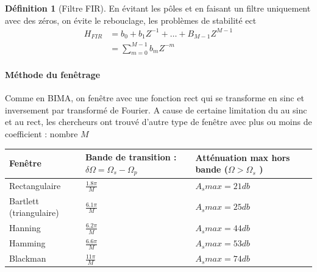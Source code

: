 \documentclass{article}
\theoremstyle{plain}%
\theoremstyle{definition}
\newtheorem{defn}{Définition}[section]
\theoremstyle{remark}
\begin{document}
\begin{defn}[Filtre FIR]
    En évitant les pôles et en faisant un filtre uniquement avec des zéros, on évite le rebouclage, les problèmes de stabilité ect
    \begin{align*}
        H_{FIR} &= b_0 + b_1 Z^{-1} + \dots + B_{M-1}Z^{M-1} \\
                &= \sum_{m=0}^{M-1}b_m Z^{-m}
    \end{align*}
\end{defn}

\paragraph*{Méthode du fenêtrage}
Comme en BIMA, on fenêtre avec une fonction rect qui se transforme en sinc et inversement par transformé de Fourier. A cause de certaine limitation du au sinc et au rect, les chercheurs ont trouvé d'autre type de fenêtre avec plus ou moins de coefficient : nombre $ M $ 

\begin{table}[!ht]
    \centering
    \begin{tabular}{|l|l|l|}
    \hline
        Fenêtre & Bande de transition : $ \delta \Omega = \Omega _s - \Omega _p $   & Atténuation max hors bande ($ \Omega > \Omega _s $ )  \\ \hline
        Rectangulaire & $\frac{1.8 \pi }{M}$ & $ A_s max = 21db $ \\ \hline
        Bartlett (triangulaire) & $\frac{6.1 \pi }{M}$ & $ A_s max = 25db $ \\ \hline
        Hanning & $\frac{6.2\pi }{M}$ & $ A_s max = 44db $ \\ \hline
        Hamming & $\frac{6.6 \pi }{M}$ & $ A_s max = 53db $ \\ \hline
        Blackman & $\frac{11 \pi }{M}$ & $ A_s max = 74db $ \\ \hline
    \end{tabular}
\end{table}
\end{document}
